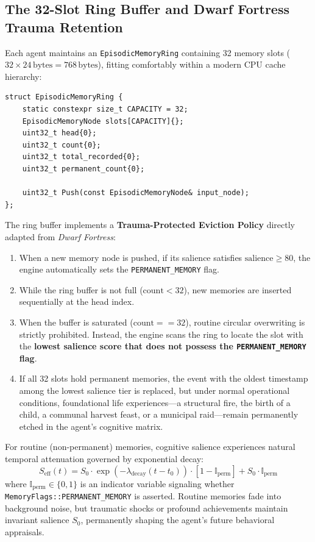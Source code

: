 \subsection{The 32-Slot Ring Buffer and Dwarf Fortress Trauma Retention}
Each agent maintains an \texttt{EpisodicMemoryRing} containing 32 memory slots ($32 \times 24\,\text{bytes} = 768\,\text{bytes}$), fitting comfortably within a modern CPU cache hierarchy:
\begin{verbatim}
struct EpisodicMemoryRing {
    static constexpr size_t CAPACITY = 32;
    EpisodicMemoryNode slots[CAPACITY]{};
    uint32_t head{0};
    uint32_t count{0};
    uint32_t total_recorded{0};
    uint32_t permanent_count{0};

    uint32_t Push(const EpisodicMemoryNode& input_node);
};
\end{verbatim}

The ring buffer implements a \textbf{Trauma-Protected Eviction Policy} directly adapted from \textit{Dwarf Fortress}:
\begin{enumerate}
    \item When a new memory node is pushed, if its salience satisfies $\text{salience} \ge 80$, the engine automatically sets the \texttt{PERMANENT\_MEMORY} flag.
    \item While the ring buffer is not full ($\text{count} < 32$), new memories are inserted sequentially at the head index.
    \item When the buffer is saturated ($\text{count} == 32$), routine circular overwriting is strictly prohibited. Instead, the engine scans the ring to locate the slot with the \textbf{lowest salience score that does not possess the \texttt{PERMANENT\_MEMORY} flag}.
    \item If all 32 slots hold permanent memories, the event with the oldest timestamp among the lowest salience tier is replaced, but under normal operational conditions, foundational life experiences---a structural fire, the birth of a child, a communal harvest feast, or a municipal raid---remain permanently etched in the agent's cognitive matrix.
\end{enumerate}

For routine (non-permanent) memories, cognitive salience experiences natural temporal attenuation governed by exponential decay:
\begin{equation}
S_{\mathrm{eff}}(t) = S_0 \cdot \exp\left(-\lambda_{\mathrm{decay}} (t - t_0)\right) \cdot \left[1 - \mathbb{I}_{\mathrm{perm}}\right] + S_0 \cdot \mathbb{I}_{\mathrm{perm}}
\label{eq:salience_decay}
\end{equation}
where $\mathbb{I}_{\mathrm{perm}} \in \{0, 1\}$ is an indicator variable signaling whether \texttt{MemoryFlags::PERMANENT\_MEMORY} is asserted. Routine memories fade into background noise, but traumatic shocks or profound achievements maintain invariant salience $S_0$, permanently shaping the agent's future behavioral appraisals.

